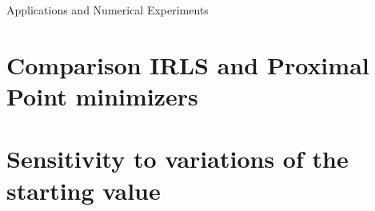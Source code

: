 \begin{chapter}{Applications and Numerical Experiments}

\FloatBarrier
\section{Comparison IRLS and Proximal Point minimizers} %
\label{sec:Comparison IRLS and Proximal Point minimizers}


\FloatBarrier
\section{Sensitivity to variations of the starting value} %
\label{sec:Sensitivity to variations of the starting value}


\end{chapter}
